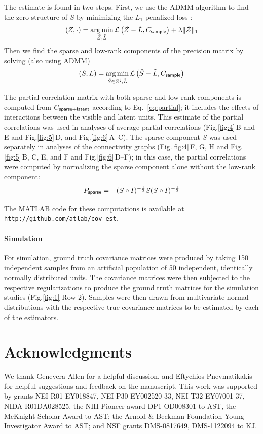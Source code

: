 \documentclass[10pt]{article}
\newcommand{\figref}[2]{Fig.\;\ref{fig:#1}\,#2}
\newcommand{\loss}[1]{\mathcal L\left(#1\right)}
\DeclareMathOperator*{\argmin}{arg\,min}
\begin{document}
The estimate is found in two steps. First, we use the ADMM algorithm to find the zero structure of $S$ by minimizing the $L_1$-penalized loss \cite{Chandrasekaran:2010,Ma:2013}:
\begin{equation}
(Z,\cdot) = \argmin\limits_{\tilde Z,\tilde L} \loss{\tilde Z-\tilde L, C_{\sf sample}} + \lambda\|\tilde Z\|_1
\end{equation}
Then we find the sparse and low-rank components of the precision matrix by solving (also using ADMM) 
\begin{equation}
(S,L) = \argmin\limits_{\tilde S \in Z^\sharp,\tilde L} \loss{\tilde S-\tilde L, C_{\sf sample} }
\end{equation}

The partial correlation matrix with both sparse and low-rank components is computed from $C_{\sf sparse+latent}$ according to Eq.~\ref{eq:partial}; it includes the effects of interactions between the visible and latent units.  This estimate of the partial correlations was used in analyses of average partial correlations (\figref{4}{B and E} and \figref{5}{D}, and \figref{6}{A--C}).  The sparse component $S$ was used separately in analyses of the connectivity graphs (\figref{4}{F, G, H} and \figref{5}{B, C, E, and F} and \figref{6}{D--F}); in this case, the partial correlations were computed by normalizing the sparse component alone without the low-rank component: 
\begin{equation}
P_{\sf sparse} = -(S\circ I)^{-\frac 1 2} S  (S\circ I)^{-\frac 1 2}
\end{equation}

The MATLAB code for these computations is available at {\tt http://github.com/atlab/cov-est}.


\paragraph{Simulation}
For simulation, ground truth covariance matrices were produced by taking 150 independent samples from an artificial population of 50 independent, identically normally distributed units. The covariance matrices were then subjected to the respective regularizations to produce the ground truth matrices for the simulation studies (\figref{1}{\,Row 2}). Samples were then drawn from multivariate normal distributions with the respective true covariance matrices to be estimated by each of the estimators. 

\section*{Acknowledgments}
We thank Genevera Allen for a helpful discussion, and Eftychios Pnevmatikakis for helpful suggestions and feedback on the manuscript.  This work was supported by grants NEI R01-EY018847, NEI P30-EY002520-33, NEI T32-EY07001-37, NIDA R01DA028525, the NIH-Pioneer award DP1-OD008301 to AST, the McKnight Scholar Award to AST; the Arnold \& Beckman Foundation Young Investigator Award to AST; and NSF grants DMS-0817649, DMS-1122094 to KJ.

\end{document}
